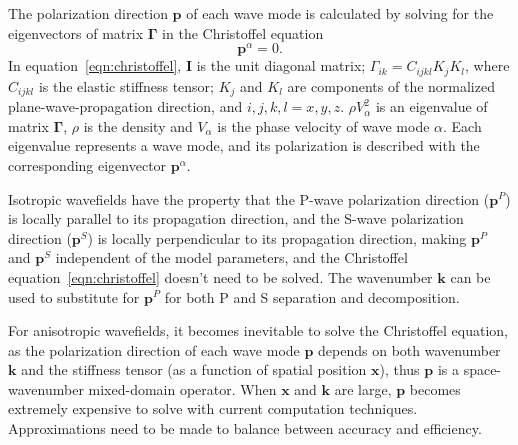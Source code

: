 \documentclass[manuscript,ulem,graphix,revised]{geophysics}
\begin{document}
The polarization direction $\boldsymbol{p}$ of each wave mode is calculated by solving for the eigenvectors of matrix $\boldsymbol{\Gamma}$ in the Christoffel equation \citep{aki80, tsvankin05}
\begin{equation}
[\boldsymbol{\Gamma}-\rho V_\alpha^2\boldsymbol{I}]\boldsymbol{p}^\alpha=0. 
\label{eqn:christoffel}
\end{equation}
In equation~\ref{eqn:christoffel}, $\boldsymbol{I}$ is the unit diagonal matrix; $\Gamma_{ik}=C_{ijkl}K_jK_l$, where $C_{ijkl}$ is the elastic stiffness tensor; $K_j$ and $K_l$ are components of the normalized plane-wave-propagation direction, and $i,j,k,l = x,y,z$. $\rho V_\alpha^2$ is an eigenvalue of matrix $\boldsymbol{\Gamma}$, $\rho$ is the density and $V_\alpha$ is the phase velocity of wave mode $\alpha$. Each eigenvalue represents a wave mode, and its polarization is described with the corresponding eigenvector $\boldsymbol{p}^\alpha$.

Isotropic wavefields have the property that the P-wave polarization direction ($\boldsymbol{p}^P$) is locally parallel to its propagation direction, and the S-wave polarization direction ($\boldsymbol{p}^S$) is locally perpendicular to its propagation direction, making $\boldsymbol{p}^P$ and $\boldsymbol{p}^S$ independent of the model parameters, and the Christoffel equation~\ref{eqn:christoffel} doesn't need to be solved. The wavenumber $\boldsymbol{k}$ can be used to substitute for $\boldsymbol{p}^P$ for both P and S separation and decomposition.

For anisotropic wavefields, it becomes inevitable to solve the Christoffel equation, as the polarization direction of each wave mode $\boldsymbol{p}$ depends on both wavenumber $\boldsymbol{k}$ and the stiffness tensor (as a function of spatial position $\boldsymbol{x}$),
thus $\boldsymbol{p}$ is a space-wavenumber mixed-domain operator. When $\boldsymbol{x}$ and $\boldsymbol{k}$ are large, $\boldsymbol{p}$ becomes extremely expensive to solve with current computation techniques. Approximations need to be made to balance between accuracy and efficiency.
\end{document}
